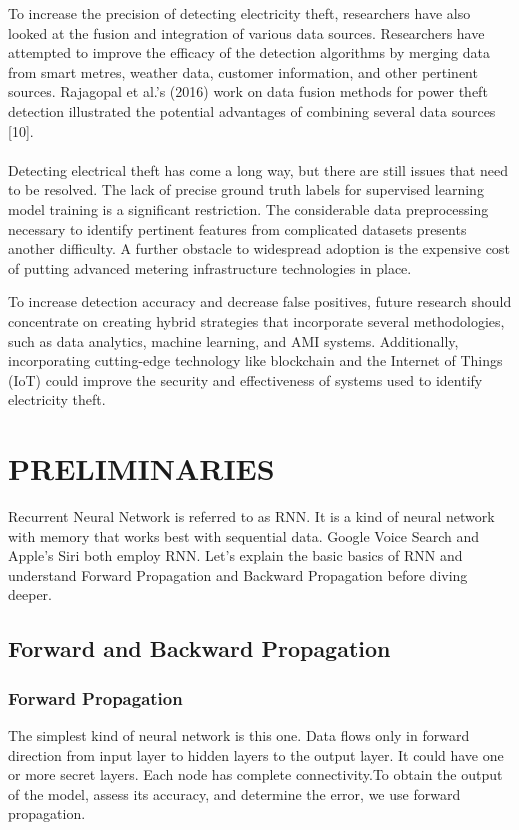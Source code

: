 \documentclass{ieeeaccess}
\begin{document}
To increase the precision of detecting electricity theft, researchers have also looked at the fusion and integration of various data sources. Researchers have attempted to improve the efficacy of the detection algorithms by merging data from smart metres, weather data, customer information, and other pertinent sources. Rajagopal et al.'s (2016) work on data fusion methods for power theft detection illustrated the potential advantages of combining several data sources [10].
\\
\\
Detecting electrical theft has come a long way, but there are still issues that need to be resolved. The lack of precise ground truth labels for supervised learning model training is a significant restriction. The considerable data preprocessing necessary to identify pertinent features from complicated datasets presents another difficulty. A further obstacle to widespread adoption is the expensive cost of putting advanced metering infrastructure technologies in place.

To increase detection accuracy and decrease false positives, future research should concentrate on creating hybrid strategies that incorporate several methodologies, such as data analytics, machine learning, and AMI systems. Additionally, incorporating cutting-edge technology like blockchain and the Internet of Things (IoT) could improve the security and effectiveness of systems used to identify electricity theft.

\section{PRELIMINARIES}
Recurrent Neural Network is referred to as RNN. It is a kind of neural network with memory that works best with sequential data. Google Voice Search and Apple's Siri both employ RNN. Let’s explain the basic basics of RNN and understand Forward Propagation and Backward Propagation before diving deeper.

\subsection{Forward and Backward Propagation}
\subsubsection{Forward Propagation}
The simplest kind of neural network is this one. Data flows only in forward direction from input layer to hidden layers to the output layer. It could have one or more secret layers. Each node has complete connectivity.To obtain the output of the model, assess its accuracy, and determine the error, we use forward propagation.
\end{document}
